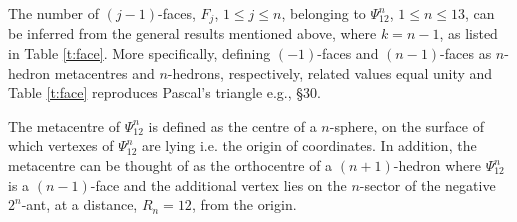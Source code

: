 \documentclass[12pt,a4paper]{article}
\begin{document}
The number of $(j-1)$-faces, $F_j$, $1\le j\le n$, belonging to
$\Psi_{12}^n$, $1\le n\le13$, can be inferred from the general results
mentioned above, where $k=n-1$, as listed in Table \ref{t:face}.   More
specifically, defining $(-1)$-faces and $(n-1)$-faces as $n$-hedron
metacentres and $n$-hedrons, respectively, related values equal unity and
Table \ref{t:face} reproduces Pascal's triangle e.g., \cite{Hoo07} \S30.

The metacentre of $\Psi_{12}^n$ is defined as the centre of a
$n$-sphere, on the surface of which vertexes of $\Psi_{12}^n$ are
lying i.e. the origin of coordinates.   In addition, the metacentre can be
thought of as the orthocentre of a $(n+1)$-hedron where $\Psi_{12}^n$ is a
$(n-1)$-face and the additional vertex lies on the $n$-sector of the
negative $2^n$-ant, at a distance, $R_n=12$, from the origin.
\end{document}
